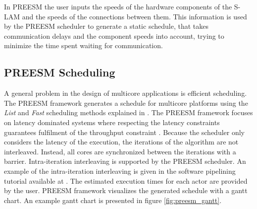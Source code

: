 In PREESM the user inputs the speeds of the hardware components of the S-LAM and the speeds of the connections between them. This information is used by the PREESM scheduler to generate a static schedule, that takes communication delays and the component speeds into account, trying to minimize the time spent waiting for communication.~\cite{pelcat2009system}

\subsection{PREESM Scheduling}
\label{sec:preesmsched}
A general problem in the design of multicore applications is efficient scheduling. The PREESM framework generates a schedule for multicore platforms using the \textit{List} and \textit{Fast} scheduling methods explained in \cite{kwok1997high}. The PREESM framework focuses on latency dominated systems where respecting the latency constraints guarantees fulfilment of the throughput constraint \cite{pelcat2014preesm, ghamarian2006throughput}. Because the scheduler only considers the latency of the execution, the iterations of the algorithm are not interleaved. Instead, all cores are synchronized between the iterations with a barrier. Intra-iteration interleaving is supported by the PREESM scheduler. \cite{pelcat2014preesm} An example of the intra-iteration interleaving is given in the software pipelining tutorial available at \cite{preesm} . The estimated execution times for each actor are provided by the user. PREESM framework visualizes the generated schedule with a gantt chart. An example gantt chart is presented in figure \ref{fig:preesm_gantt}.\\ 
